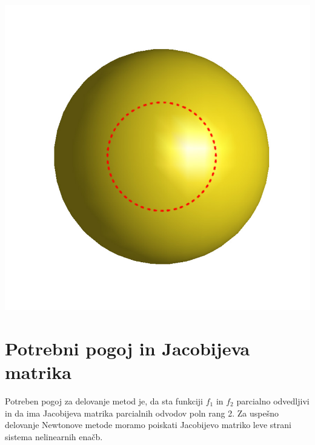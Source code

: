 \documentclass[]{article}
\begin{document}
	\includegraphics[scale=0.2]{eul3_newt}
	
\section{Potrebni pogoj in Jacobijeva matrika}
	Potreben pogoj za delovanje metod je, da sta funkciji $f_{1}$ in $f_{2}$ parcialno odvedljivi in da ima Jacobijeva matrika parcialnih odvodov poln rang 2. Za uspešno delovanje Newtonove metode moramo poiskati Jacobijevo matriko leve strani sistema nelinearnih enačb.
\end{document}
